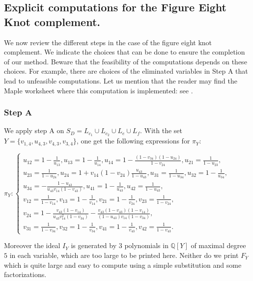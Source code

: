 \subsection{Explicit computations for the Figure Eight Knot complement.}\label{results}

We now review the different steps in the case of the figure eight knot complement. We indicate the choices that can be done to ensure the completion of our method. Beware that the feasibility of the computations depends on these choices. For example, there are choices of the eliminated variables in Step A that lead to unfeasible computations. Let us mention that the reader may find the Maple worksheet where this computation is implemented: see \cite{Worksheet}.

\subsubsection{{\bf Step A}}

We apply step A on $S_{D} =L_{c_{1}} \cup L_{c_{2}} \cup L_{e} \cup
L_{f}$. With the set $Y= \{ v_{1,4} ,u_{4,3} ,v_{4,3} ,v_{3,4} \}$, one get the following expressions for $\pi_Y$:
{\small \begin{center}
  $\pi_{Y} : \left\{ \begin{array}{l}
    u_{12} =1- \frac{1}{u_{13}} ,u_{13} =1- \frac{1}{u_{14}} ,u_{14} =1-
    \frac{(1-v_{34} )(1-u_{24} )}{1-v_{24}} ,u_{21} = \frac{1}{1-u_{23}} ,\\
    u_{23} = \frac{1}{1-u_{24}} ,u_{24} =1+v_{14} (1-v_{24} )
    \frac{u_{43}}{1-u_{43}} ,u_{31} = \frac{1}{1-u_{34}} ,u_{32} =1-
    \frac{1}{u_{34}} ,\\
    u_{34} =- \frac{1-u_{43}}{u_{43} v_{14} (1-v_{43} )} ,u_{41} =1-
    \frac{1}{u_{43}} ,u_{42} = \frac{1}{1-u_{43}} ,\\
    v_{12} = \frac{1}{1-v_{14}} ,v_{13} =1- \frac{1}{v_{14}} ,v_{21} =1-
    \frac{1}{v_{24}} ,v_{23} = \frac{1}{1-v_{24}} ,\\
    v_{24} =1- \frac{v_{43} (1-v_{14} )}{u_{43} v_{14}^{2} (1-v_{34} )} -
    \frac{v_{43} (1-v_{43} )(1-v_{14} )}{(1-u_{43} )v_{14} (1-v_{34} )} ,\\
    v_{31} = \frac{1}{1-v_{34}} ,v_{32} =1- \frac{1}{v_{34}} ,v_{41} =1-
    \frac{1}{v_{43}} ,v_{42} = \frac{1}{1-v_{43}} .
  \end{array} \right.$
\end{center}}
Moreover the ideal $I_{Y}$ is generated by $3$ polynomials in $\mathbb{Q} [
Y ]$ of maximal degree $5$ in each variable, which are too large to be printed
here. Neither do we print $F_{Y}$ which is quite large and easy to compute using a
simple substitution and some factorizations.

